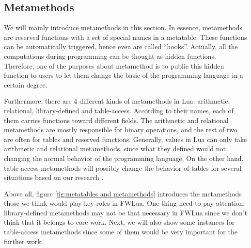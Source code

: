 \subsection{Metamethods}
We will mainly introduce metamethods in this section. In essence, metamethods are reserved functions with a set of special names in a metatable. These functions can be automatically triggered, hence even are called ``hooks''. Actually, all the computations during programming can be thought as hidden functions. Therefore, one of the purposes about metamethod is to public this hidden function to users to let them change the basic of the programming language in a certain degree.

Furthermore, there are 4 different kinds of metamethods in Lua: arithmetic, relational, library-defined and table-access. According to their names, each of them carries functions toward different fields. The arithmetic and relational metamethods are mostly responsible for binary operations, and the rest of two are often for tables and reserved functions. Generally, values in Lua can only take arithmetic and relational metamethods, since what they defined would not changing the normal behavior of the programming language. On the other hand, table-access metamethods will possibly change the behavior of tables for several situations based on our research \cite{PIL}.

Above all, figure \ref{fig:metatables and metamethods} introduces the metamethods those we think would play key roles in FWLua. One thing need to pay attention: library-defined metamethods may not be that necessary in FWLua since we don't think that it belongs to core work. Next, we will also show some instances for table-access metamethods since some of them would be very important for the further work.

